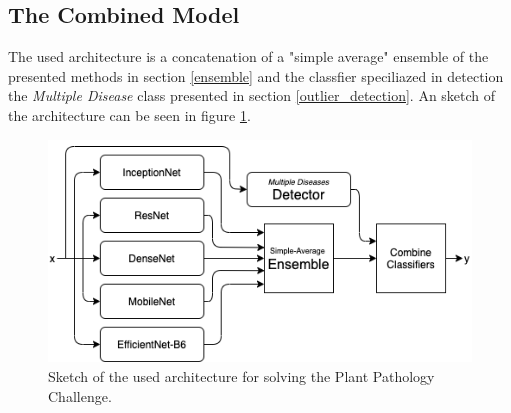\documentclass[10pt,twocolumn,letterpaper]{article}
\begin{document}
\subsection{The Combined Model} \label{combined}
The used architecture is a concatenation of a "simple average" ensemble of the presented methods in section \ref{ensemble} and the classfier speciliazed in detection the \textit{Multiple Disease} class presented in section \ref{outlier_detection}. An sketch of the architecture can be seen in figure \ref{architecture}.

\begin{figure}[htb]
\begin{center}
\includegraphics[width=\linewidth]{images/architecture_sketch.png}
\end{center}
   \caption{Sketch of the used architecture for solving the Plant Pathology Challenge.}
\label{architecture}  
\end{figure}
\end{document}
